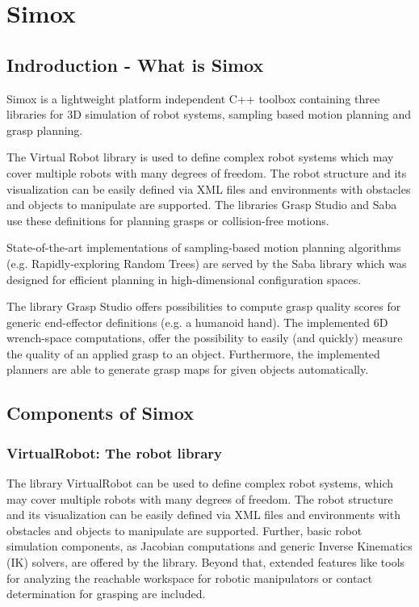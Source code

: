 \documentclass{book}
\begin{document}
\section{Simox}
\subsection{Indroduction - What is Simox}
Simox is a lightweight platform independent C++ toolbox containing three libraries for 3D simulation of robot systems, sampling based motion planning and grasp planning. \par The Virtual Robot library is used to define complex robot systems which may cover multiple robots with many degrees of freedom. The robot structure and its visualization can be easily defined via XML files and environments with obstacles and objects to manipulate are supported. The libraries Grasp Studio and Saba use these definitions for planning grasps or collision-free motions.\par State-of-the-art implementations of sampling-based motion planning algorithms (e.g. Rapidly-exploring Random Trees) are served by the Saba library which was designed for efficient planning in high-dimensional configuration spaces. \par The library Grasp Studio offers possibilities to compute grasp quality scores for generic end-effector definitions (e.g. a humanoid hand). The implemented 6D wrench-space computations, offer the possibility to easily (and quickly) measure the quality of an applied grasp to an object. Furthermore, the implemented planners are able to generate grasp maps for given objects automatically.
\subsection{Components of Simox}
\subsubsection{VirtualRobot: The robot library}
The library VirtualRobot can be used to define complex robot systems, which may cover multiple robots with many degrees of freedom. The robot structure and its visualization can be easily defined via XML files and environments with obstacles and objects to manipulate are supported. Further, basic robot simulation components, as Jacobian computations and generic Inverse Kinematics (IK) solvers, are offered by the library. Beyond that, extended features like tools for analyzing the reachable workspace for robotic manipulators or contact determination for grasping are included. 
\end{document}
